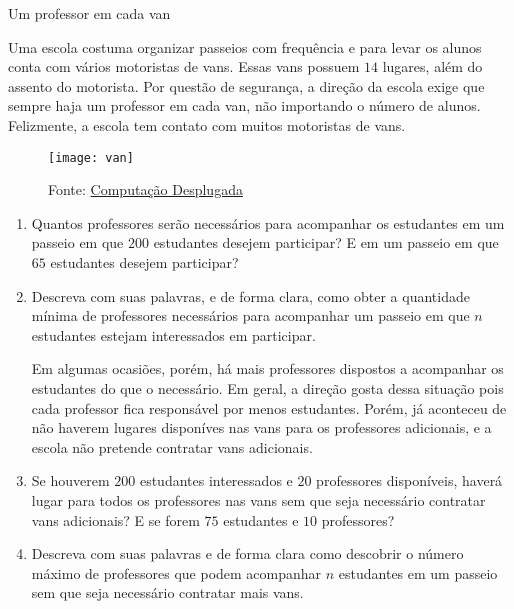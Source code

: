 \begin{task}{Um professor em cada van}
\label{comp-task5}

Uma escola costuma organizar passeios com frequência e para levar os alunos conta com vários motoristas de vans. Essas vans possuem $14$ lugares, além do assento do motorista. Por questão de segurança, a direção da escola exige que sempre haja um professor em cada van, não importando o número de alunos. Felizmente, a escola tem contato com muitos motoristas de vans.

\begin{figure}[H]
\centering

\texttt{[image: van]}
\caption{Fonte: \href{desplugada.ime.unicamp.br}{Computação Desplugada}}
\end{figure}

\begin{enumerate}
\item Quantos professores serão necessários para acompanhar os estudantes em um passeio em que $200$ estudantes desejem participar? E em um passeio em que $65$ estudantes desejem participar?

\item Descreva com suas palavras, e de forma clara, como obter a quantidade mínima de professores necessários para acompanhar um passeio em que $n$ estudantes estejam interessados em participar.

Em algumas ocasiões, porém, há mais professores dispostos a acompanhar os estudantes do que o necessário. Em geral, a direção gosta dessa situação pois cada professor fica responsável por menos estudantes. Porém, já aconteceu de não haverem lugares disponíves nas vans para os professores adicionais, e a escola não pretende contratar vans adicionais.

\item Se houverem $200$ estudantes interessados e $20$ professores disponíveis, haverá lugar para todos os professores nas vans sem que seja necessário contratar vans adicionais? E se forem $75$ estudantes e $10$ professores?

\item Descreva com suas palavras e de forma clara como descobrir o número máximo de professores que podem acompanhar $n$ estudantes em um passeio sem que seja necessário contratar mais vans.
\end{enumerate}



\end{task}

